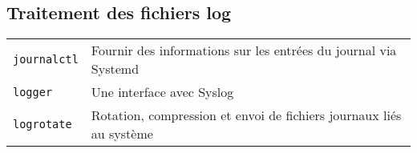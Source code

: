 \documentclass[10pt,a4paper]{article}
\begin{document}
\begin{multicols}{2}
\section{Traitement des fichiers log}
\begin{tabular}{ p{2.5cm} p{8.5cm} }
  \hline
  \texttt{journalctl} & Fournir des informations sur les entrées du journal via Systemd \\
  \rowcolor{Gray}
  \texttt{logger} & Une interface avec Syslog \\
  \texttt{logrotate} & Rotation, compression et envoi de fichiers journaux liés au système \\
  \hline
\end{tabular}

\end{multicols}

\newpage

\cheatsheet
\end{document}
